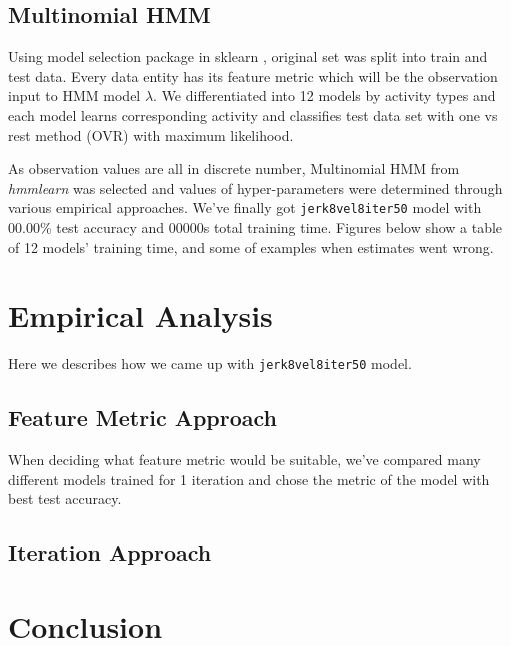\documentclass[10pt,twocolumn,letterpaper]{article}
\begin{document}
\subsection{Multinomial HMM}
Using model selection package in sklearn \cite{sklearn}, original set was split into train and test data. Every data entity has its feature metric which will be the observation input to HMM model $\lambda$. We differentiated into 12 models by activity types and each model learns corresponding activity and classifies test data set with one vs rest method (OVR) with maximum likelihood. 

As observation values are all in discrete number, Multinomial HMM from \textit{hmmlearn} was selected and values of hyper-parameters were determined through various empirical approaches. We've finally got \texttt{jerk8vel8iter50} model with 00.00\% test accuracy and 00000s total training time. Figures below show a table of 12 models' training time, and some of examples when estimates went wrong.

\section{Empirical Analysis}

Here we describes how we came up with \texttt{jerk8vel8iter50} model. 

\subsection{Feature Metric Approach}
When deciding what feature metric would be suitable, we've compared many different models trained for 1 iteration and chose the metric of the model with best test accuracy.

\subsection{Iteration Approach}

\section{Conclusion}
\end{document}
